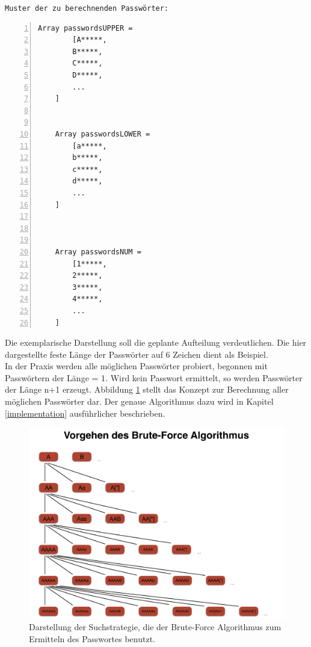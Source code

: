 \texttt{Muster der zu berechnenden Passwörter:}
\begin{lstlisting}[basicstyle=\ttfamily,numbers=left,numberstyle=\footnotesize\ttfamily,backgroundcolor=\color{sourcegray}]
	Array passwordsUPPER = 
		[A*****,
	 	B*****,
	 	C*****,
	 	D*****,
	 	...
	]
	
	
	Array passwordsLOWER = 
		[a*****,
	 	b*****,
	 	c*****,
	 	d*****,
		...
	]
	
	

	Array passwordsNUM = 
		[1*****,
	 	2*****,
	 	3*****,
	 	4*****,
		...
	]
\end{lstlisting}

Die exemplarische Darstellung soll die geplante Aufteilung verdeutlichen. Die hier dargestellte feste Länge der Passwörter auf 6 Zeichen dient als Beispiel. \\

In der Praxis werden alle möglichen Passwörter probiert, begonnen mit Passwörtern der Länge = 1. Wird kein Passwort ermittelt, so werden Passwörter der Länge n+1 erzeugt. Abbildung \ref{fig:schemaBruteForce} stellt das Konzept zur Berechnung aller möglichen Passwörter dar. Der genaue Algorithmus dazu wird in Kapitel \ref{implementation} ausführlicher beschrieben. \\
\begin{figure}[!ht]
	\centering
		\includegraphics[natwidth=1200pt, natheight=349pt, width=1.0\textwidth]{images/SchaubildAlgorithmBreitensuche.pdf}
	\caption{Darstellung der Suchstrategie, die der Brute-Force Algorithmus zum Ermitteln des Passwortes benutzt.}
	\label{fig:schemaBruteForce}
\end{figure}

